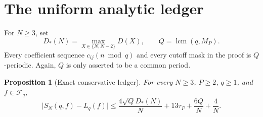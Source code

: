 \documentclass[11pt]{article}
\newtheorem{proposition}[theorem]{Proposition}
\theoremstyle{definition}
\theoremstyle{remark}
\newcommand{\Fcal}{\mathcal F}
\newcommand{\abs}[1]{\lvert#1\rvert}
\begin{document}
\section{The uniform analytic ledger}

For $N\ge3$, set
\begin{equation}
 D_*(N)=\max_{X\in\{N,N-2\}}D(X),
 \qquad Q=\operatorname{lcm}(q,M_P).
 \label{eq:D-star}
\end{equation}
Every coefficient sequence $c_{ij}(n\bmod q)$ and every cutoff mask in the
proof is $Q$-periodic.  Again, $Q$ is only asserted to be a common period.

\begin{proposition}[Exact conservative ledger]
\label{prop:ledger}
For every $N\ge3$, $P\ge2$, $q\ge1$, and $f\in\Fcal_q$,
\begin{equation}
 \boxed{
 \abs{S_N(q,f)-L_q(f)}
 \le\frac{4\sqrt QD_*(N)}N+13\tau_P+\frac{6Q}N+\frac4N.}
 \label{eq:master-bound}
\end{equation}
\end{proposition}
\end{document}
